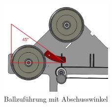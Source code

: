     \begin{figure}[h!]
       	\includegraphics[width=0.5\textwidth,clip,trim=20mm 5mm 0mm 5mm]
       	{Enddokumentation/Bilder/Abschuss.JPG}
       	\centering
       	\caption{Ballzuführung mit Abschusswinkel}
       	\label{abb:Abschusswinkel}
    \end{figure}
